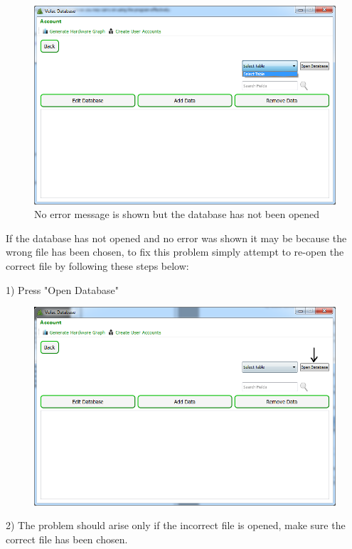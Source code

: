 \begin{figure}[H]
    \includegraphics[width=\textwidth]{./Manual/Images/incorrectfile3.png}
\caption{No error message is shown but the database has not been opened}
\end{figure}

If the database has not opened and no error was shown it may be because the wrong file has been chosen, to fix this problem simply attempt to re-open the correct file by following these steps below:

1) Press "Open Database"

\begin{figure}[H]
    \includegraphics[width=\textwidth]{./Manual/Images/opendb3.png}
\end{figure}

2) The problem should arise only if the incorrect file is opened, make sure the correct file has been chosen.


